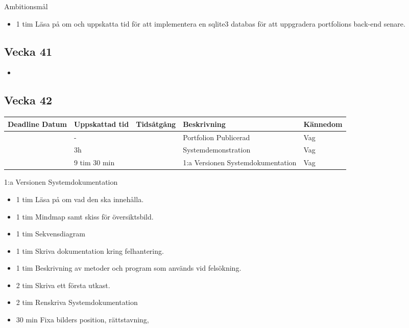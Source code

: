 \documentclass{TDP003mall}
\begin{document}
Ambitionsmål
\begin{itemize}
\item 1 tim Läsa på om och uppskatta tid för att implementera en sqlite3 databas för att uppgradera portfolions back-end senare.
  \end{itemize}

\subsection{Vecka 41}

\begin{itemize}
  \item
\end{itemize}


\subsection{Vecka 42}
\begin{tabularx}{\linewidth}{|l|l|l|X|l|}
	\hline
	Deadline Datum & Uppskattad tid & Tidsåtgång & Beskrivning                       & Kännedom \\ [0.5ex]
	\hline
                   & -              &            & Portfolion Publicerad             & Vag      \\
	\hline
                   & 3h             &            & Systemdemonstration               & Vag      \\
	\hline
                   & 9 tim 30 min   &            & 1:a Versionen Systemdokumentation & Vag      \\
	\hline
\end{tabularx}

1:a Versionen Systemdokumentation\\
\begin{itemize}
  \item 1 tim Läsa på om vad den ska innehålla.
  \item 1 tim Mindmap samt skiss för översiktsbild.
  \item 1 tim Sekvensdiagram
  \item 1 tim Skriva dokumentation kring felhantering.
  \item 1 tim Beskrivning av metoder och program som används vid felsökning.
  \item 2 tim Skriva ett första utkast.
  \item 2 tim Renskriva Systemdokumentation
  \item 30 min Fixa bilders position, rättstavning, 
\end{itemize}
\end{document}

